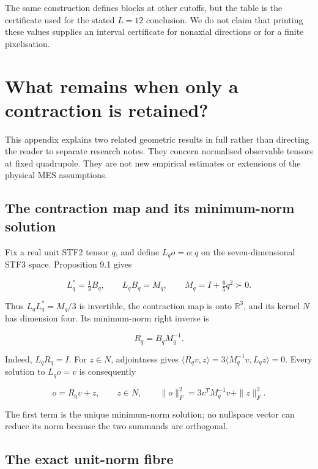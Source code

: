 \documentclass[
  11pt,
  a4paper]{article}
\begin{document}
The same construction defines blocks at other cutoffs, but the table is the certificate used for the stated \(L=12\) conclusion. We do not claim that printing these values supplies an interval certificate for nonaxial directions or for a finite pixelisation.

\hypertarget{appendix-c.-what-remains-when-only-a-contraction-is-retained}{%
\section{What remains when only a contraction is retained?}\label{appendix-c.-what-remains-when-only-a-contraction-is-retained}}

This appendix explains two related geometric results in full rather than directing the reader to separate research notes. They concern normalised observable tensors at fixed quadrupole. They are not new empirical estimates or extensions of the physical MES assumptions.

\hypertarget{c.1-the-contraction-map-and-its-minimum-norm-solution}{%
\subsection{The contraction map and its minimum-norm solution}\label{c.1-the-contraction-map-and-its-minimum-norm-solution}}

Fix a real unit STF2 tensor \(q\), and define \(L_qo=o:q\) on the seven-dimensional STF3 space. Proposition 9.1 gives

\[
L_q^*=\tfrac13B_q,\qquad L_qB_q=M_q,
\qquad M_q=I+\tfrac65q^2\succ0.
\tag{C.1}
\]

Thus \(L_qL_q^*=M_q/3\) is invertible, the contraction map is onto \(\mathbb R^3\), and its kernel \(N\) has dimension four. Its minimum-norm right inverse is

\[
R_q=B_qM_q^{-1}.
\tag{C.2}
\]

Indeed, \(L_qR_q=I\). For \(z\in N\), adjointness gives
\(\langle R_qv,z\rangle=3\langle M_q^{-1}v,L_qz\rangle=0\).
Every solution to \(L_qo=v\) is consequently

\[
o=R_qv+z,\qquad z\in N,
\qquad
\|o\|_F^2=3v^TM_q^{-1}v+\|z\|_F^2.
\tag{C.3}
\]

The first term is the unique minimum-norm solution; no nullspace vector can reduce its norm because the two summands are orthogonal.

\hypertarget{c.2-the-exact-unit-norm-fibre}{%
\subsection{The exact unit-norm fibre}\label{c.2-the-exact-unit-norm-fibre}}
\end{document}
